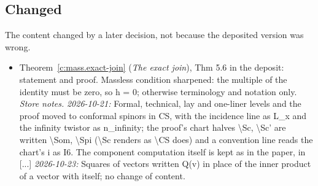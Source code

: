 \documentclass[11pt]{article}
\theoremstyle{definition}
\theoremstyle{plain}
\begin{document}
\subsection*{Changed}
The content changed by a later decision, not because the deposited version was wrong.
\begin{itemize}\setlength{\itemsep}{2pt}
\item Theorem~\ref{c:mass.exact-join} (\emph{The exact join}), Thm 5.6 in the deposit: statement and proof. Massless condition sharpened: the multiple of the identity must be zero, so h = 0; otherwise terminology and notation only. \emph{Store notes.} \emph{2026-10-21:} Formal, technical, lay and one-liner levels and the proof moved to conformal spinors in CS, with the incidence line as L\_x and the infinity twistor as n\_infinity; the proof's chart halves \textbackslash{}Sc, \textbackslash{}Sc' are written \textbackslash{}Som, \textbackslash{}Spi (\textbackslash{}Sc renders as \textbackslash{}CS does) and a convention line reads the chart's i as I6. The component computation itself is kept as in the paper, in [...] \emph{2026-10-23:} Squares of vectors written Q(v) in place of the inner product of a vector with itself; no change of content.
\end{itemize}
\end{document}
